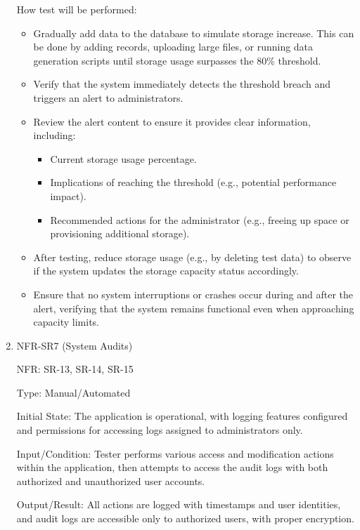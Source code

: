 \documentclass[12pt, titlepage]{article}
\begin{document}
\begin{enumerate}
  How test will be performed: 
  \begin{itemize}
    \item Gradually add data to the database to simulate storage increase. This can
    be done by adding records, uploading large files, or running data generation
    scripts until storage usage surpasses the 80\% threshold.
    \item Verify that the system immediately detects the threshold breach and triggers
    an alert to administrators.
    \item Review the alert content to ensure it provides clear information, including:
    \begin{itemize}
      \item Current storage usage percentage.
      \item Implications of reaching the threshold (e.g., potential performance impact).
      \item Recommended actions for the administrator (e.g., freeing up space or
      provisioning additional storage).
    \end{itemize}
    \item After testing, reduce storage usage (e.g., by deleting test data) to observe
    if the system updates the storage capacity status accordingly.
    \item Ensure that no system interruptions or crashes occur during and after the alert,
    verifying that the system remains functional even when approaching capacity limits.
  \end{itemize}

\item{NFR-SR7 (System Audits)\\}
  
  NFR: SR-13, SR-14, SR-15
  
  Type: Manual/Automated
  
  Initial State: The application is operational, with logging features configured and
  permissions for accessing logs assigned to administrators only.
  
  Input/Condition: Tester performs various access and modification actions within the
  application, then attempts to access the audit logs with both authorized and
  unauthorized user accounts.
  
  Output/Result: All actions are logged with timestamps and user identities, and audit
  logs are accessible only to authorized users, with proper encryption.


\end{enumerate}
\end{document}
